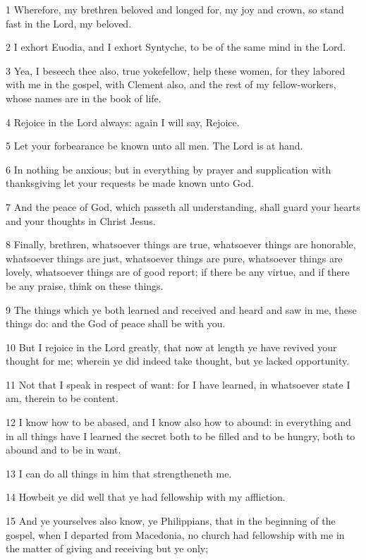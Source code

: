 \par 1 Wherefore, my brethren beloved and longed for, my joy and crown, so stand fast in the Lord, my beloved.
\par 2 I exhort Euodia, and I exhort Syntyche, to be of the same mind in the Lord.
\par 3 Yea, I beseech thee also, true yokefellow, help these women, for they labored with me in the gospel, with Clement also, and the rest of my fellow-workers, whose names are in the book of life.
\par 4 Rejoice in the Lord always: again I will say, Rejoice.
\par 5 Let your forbearance be known unto all men. The Lord is at hand.
\par 6 In nothing be anxious; but in everything by prayer and supplication with thanksgiving let your requests be made known unto God.
\par 7 And the peace of God, which passeth all understanding, shall guard your hearts and your thoughts in Christ Jesus.
\par 8 Finally, brethren, whatsoever things are true, whatsoever things are honorable, whatsoever things are just, whatsoever things are pure, whatsoever things are lovely, whatsoever things are of good report; if there be any virtue, and if there be any praise, think on these things.
\par 9 The things which ye both learned and received and heard and saw in me, these things do: and the God of peace shall be with you.
\par 10 But I rejoice in the Lord greatly, that now at length ye have revived your thought for me; wherein ye did indeed take thought, but ye lacked opportunity.
\par 11 Not that I speak in respect of want: for I have learned, in whatsoever state I am, therein to be content.
\par 12 I know how to be abased, and I know also how to abound: in everything and in all things have I learned the secret both to be filled and to be hungry, both to abound and to be in want.
\par 13 I can do all things in him that strengtheneth me.
\par 14 Howbeit ye did well that ye had fellowship with my affliction.
\par 15 And ye yourselves also know, ye Philippians, that in the beginning of the gospel, when I departed from Macedonia, no church had fellowship with me in the matter of giving and receiving but ye only;
